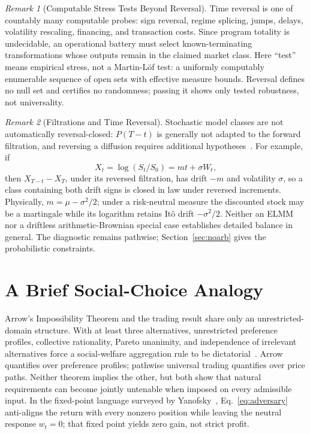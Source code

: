 \documentclass[aps,pra,reprint,superscriptaddress,amsmath,amssymb,floatfix]{revtex4-2}
\theoremstyle{plain}
\theoremstyle{definition}
\theoremstyle{remark}
\newtheorem{remark}{Remark}
\begin{document}
\begin{remark}[Computable Stress Tests Beyond Reversal]
\label{rem:stressfamily}
Time reversal is one of countably many computable probes: sign reversal,
regime splicing, jumps, delays, volatility rescaling, financing, and transaction
costs. Since program totality is undecidable, an operational battery must select
known-terminating transformations whose outputs remain in the claimed market
class. Here ``test'' means empirical stress, not a Martin-L\"of test: a uniformly
computably enumerable sequence of open sets with effective measure bounds.
Reversal defines no null set and certifies no randomness; passing it shows only
tested robustness, not universality.
\end{remark}

\begin{remark}[Filtrations and Time Reversal]
Stochastic model classes are not automatically reversal-closed:
\(P(T-t)\) is generally not adapted to the forward filtration, and reversing a
diffusion requires additional hypotheses~\cite{HaussmannPardoux1986}. For
example, if
\[
  X_t=\log(S_t/S_0)=mt+\sigma W_t,
\]
then \(X_{T-t}-X_T\), under its reversed filtration, has drift \(-m\) and
volatility \(\sigma\), so a class containing both drift signs is closed in law
under reversed increments. Physically, \(m=\mu-\sigma^2/2\); under a
risk-neutral measure the discounted stock may be a martingale while its
logarithm retains It\^o drift \(-\sigma^2/2\). Neither an ELMM nor a driftless
arithmetic-Brownian special case establishes detailed balance in general. The
diagnostic remains pathwise; Section~\ref{sec:noarb} gives the probabilistic
constraints.
\end{remark}

\section{A Brief Social-Choice Analogy}
\label{sec:arrow}

Arrow's Impossibility Theorem and the trading result share only an
unrestricted-domain structure. With at least three alternatives, unrestricted
preference profiles, collective rationality, Pareto unanimity, and independence
of irrelevant alternatives force a social-welfare aggregation rule to be
dictatorial~\cite{Arrow1963}. Arrow quantifies over preference profiles;
pathwise universal trading quantifies over price paths. Neither theorem implies
the other, but both show that natural requirements can become jointly
untenable when imposed on every admissible input. In the fixed-point language
surveyed by Yanofsky~\cite{Yanofsky-BSL:9051621},
Eq.~\eqref{eq:adversary} anti-aligns the return with every nonzero position
while leaving the neutral response \(w_t=0\); that fixed point yields zero
gain, not strict profit.
\end{document}
